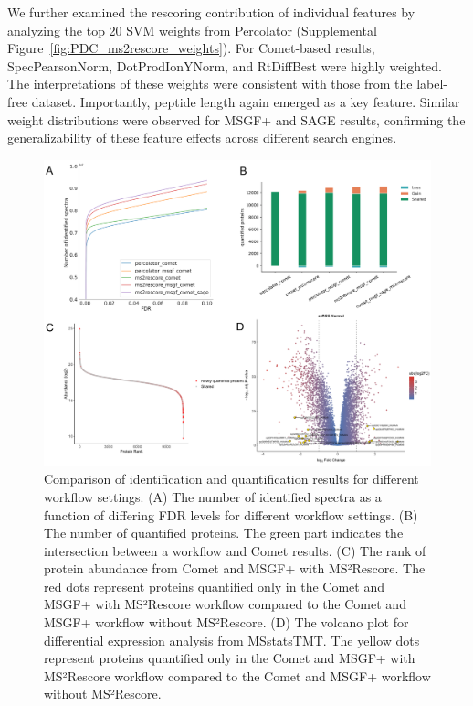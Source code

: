 \documentclass[12pt]{article}
\begin{document}
We further examined the rescoring contribution of individual features by analyzing the top 20 SVM weights from Percolator (Supplemental Figure~\ref{fig:PDC_ms2rescore_weights}). For Comet-based results, SpecPearsonNorm, DotProdIonYNorm, and RtDiffBest were highly weighted. The interpretations of these weights were consistent with those from the label-free dataset. Importantly, peptide length again emerged as a key feature. Similar weight distributions were observed for MSGF+ and SAGE results, confirming the generalizability of these feature effects across different search engines.

\begin{figure}[ht!]
	\centering
	\includegraphics[width=1\textwidth]{figures//CPTAC_TMT.png}
	\caption{Comparison of identification and quantification results for different workflow settings. (A) The number of identified spectra as a function of differing FDR levels for different workflow settings. (B) The number of quantified proteins. The green part indicates the intersection between a workflow and Comet results. (C) The rank of protein abundance from Comet and MSGF+ with MS²Rescore. The red dots represent proteins quantified only in the Comet and MSGF+ with MS²Rescore workflow compared to the Comet and MSGF+ workflow without MS²Rescore. (D) The volcano plot for differential expression analysis from MSstatsTMT. The yellow dots represent proteins quantified only in the Comet and MSGF+ with MS²Rescore workflow compared to the Comet and MSGF+ workflow without MS²Rescore.} %
	\label{fig:PDC_ms2rescore}
\end{figure}
\end{document}
